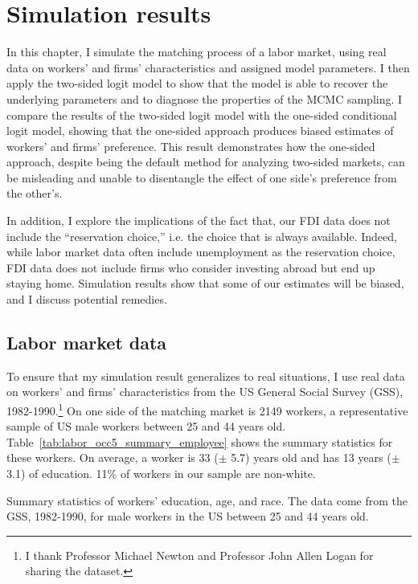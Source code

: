 \chapter{Simulation results}
\label{chap:simulation}

In this chapter, I simulate the matching process of a labor market, using real
data on workers' and firms' characteristics and assigned model parameters. I
then apply the two-sided logit model to show that the model is able to recover
the underlying parameters and to diagnose the properties of the MCMC sampling. I
compare the results of the two-sided logit model with the one-sided conditional
logit model, showing that the one-sided approach produces biased estimates of
workers' and firms' preference. This result demonstrates how the one-sided
approach, despite being the default method for analyzing two-sided markets, can
be misleading and unable to disentangle the effect of one side's preference from
the other's.

In addition, I explore the implications of the fact that, our FDI data does not
include the ``reservation choice,'' i.e. the choice that is always available.
Indeed, while labor market data often include unemployment as the reservation
choice, FDI data does not include firms who consider investing abroad but end up
staying home. Simulation results show that some of our estimates will be biased,
and I discuss potential remedies.

\section{Labor market data}

To ensure that my simulation result generalizes to real situations, I use real
data on workers' and firms' characteristics from the US General Social Survey
(GSS), 1982-1990.\footnote{I thank Professor Michael Newton and Professor John
  Allen Logan for sharing the dataset.} On one side of the matching market is
2149 workers, a representative sample of US male workers between 25 and 44 years
old. Table~\ref{tab:labor_occ5_summary_employee} shows the summary statistics
for these workers. On average, a worker is 33 ($\pm$ 5.7) years old and has 13
years ($\pm$ 3.1) of education. 11\% of workers in our sample are non-white.

\begin{table}[!ht]
  \centering
  \caption[Summary statistics of US male workers between 25 and 44 years old,
  1982-1990.]{Summary statistics of workers' education, age, and race. The data
    come from the GSS, 1982-1990, for male workers in the US between 25 and 44
    years old.}
  \label{tab:labor_occ5_summary_employee}
  
\end{table}

